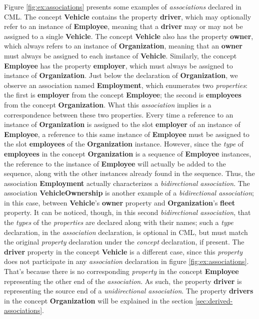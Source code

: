 \begin{examples}
Figure \ref{fig:ex:associations} presents some examples of \emph{associations} declared in CML.
The concept \textbf{Vehicle} contains the property \textbf{driver},
which may optionally refer to an instance of \textbf{Employee},
meaning that a \textbf{driver} may or may not be assigned to a single \textbf{Vehicle}.
The concept \textbf{Vehicle} also has the property \textbf{owner},
which always refers to an instance of \textbf{Organization},
meaning that an \textbf{owner} must always be assigned to each instance of \textbf{Vehicle}. 
Similarly,
the concept \textbf{Employee} has the property \textbf{employer},
which must always be assigned to instance of \textbf{Organization}.
Just below the declaration of \textbf{Organization},
we observe an association named \textbf{Employment},
which enumerates two \emph{properties}:
the first is \textbf{employer} from the concept \textbf{Employee};
the second is \textbf{employees} from the concept \textbf{Organization}.
What this \emph{association} implies is a correspondence between these two properties.
Every time a reference to an instance of \textbf{Organization} is assigned to
the slot \textbf{employer} of an instance of \textbf{Employee},
a reference to this same instance of \textbf{Employee} must be assigned to
the slot \textbf{employees} of the \textbf{Organization} instance.
However,
since the \emph{type} of \textbf{employees}
in the concept \textbf{Organization}
is a sequence of \textbf{Employee} instances,
the reference to the instance of \textbf{Employee} will actually be added to the sequence,
along with the other instances already found in the sequence.
Thus, the association \textbf{Employment} actually characterizes a \emph{bidirectional association}.
The association \textbf{VehicleOwnership} is another example of a \emph{bidirectional association};
in this case,
between \textbf{Vehicle}'s \textbf{owner} property and \textbf{Organization}'s \textbf{fleet} property.
It can be noticed, though, 
in this second \emph{bidirectional association},
that the \emph{types} of the \emph{properties} are declared along with their names;
such a \emph{type} declaration,
in the \emph{association} declaration,
is optional in CML,
but must match the original \emph{property} declaration under the \emph{concept} declaration,
if present.
The \textbf{driver} property in the concept \textbf{Vehicle} is a different case,
since this \emph{property} does not participate in any \emph{association} declaration
in figure \ref{fig:ex:associations}.
That's because there is no corresponding \emph{property} in the concept \textbf{Employee}
representing the other end of the \emph{association}.
As such, the property \textbf{driver} is representing the source end of a \emph{unidirectional association}.
The property \textbf{drivers} in the concept \textbf{Organization} will be explained
in the section \ref{sec:derived-associations}.
\end{examples}

